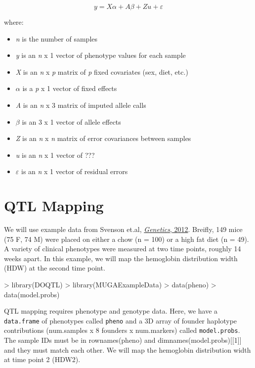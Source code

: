 \documentclass{article}
\begin{document}
\begin{equation}
y = X\alpha + A\beta + Zu + \varepsilon
\end{equation}

where:

\begin{itemize}
  \item{\textit{n} is the number of samples}
  \item{\textit{y} is an \textit{n} x 1 vector of phenotype values for each sample}
  \item{\textit{X} is an \textit{n} x \textit{p} matrix of \textit{p} fixed covariates (sex, diet, etc.) }
  \item{$\alpha$ is a \textit{p} x 1 vector of fixed effects }
  \item{\textit{A} is an \textit{n} x 3 matrix of imputed allele calls }
  \item{$\beta$ is an 3 x 1 vector of allele effects }
  \item{\textit{Z} is an \textit{n} x \textit{n} matrix of error covariances between samples }
  \item{\textit{u} is an \textit{n} x 1 vector of ???}
  \item{$\varepsilon$ is an \textit{n} x 1 vector of residual errors}
\end{itemize}

\section{QTL Mapping}

We will use example data from Svenson et.al, \href{http://www.ncbi.nlm.nih.gov/pubmed/22345611}{\textit{Genetics}, 2012}. Breifly, 149 mice (75 F, 74 M) were placed on either a chow (n = 100) or a high fat diet (n = 49). A  variety of clinical phenotypes were measured at two time points, roughly 14 weeks apart.  In this example, we will map the hemoglobin distribution width (HDW) at the second time point.

\begin{Schunk}
\begin{Sinput}
> library(DOQTL)
> library(MUGAExampleData)
> data(pheno)
> data(model.probs)
\end{Sinput}
\end{Schunk}

QTL mapping requires phenotype and genotype data. Here, we have a \texttt{data.frame} of phenotypes called \texttt{pheno} and a 3D array of founder haplotype contributions (num.samples x 8 founders x num.markers) called \texttt{model.probs}. The sample IDs must be in rownames(pheno) and dimnames(model.probs)[[1]] and they must match each other. We will map the hemoglobin distribution width at time point 2 (HDW2).
\end{document}

